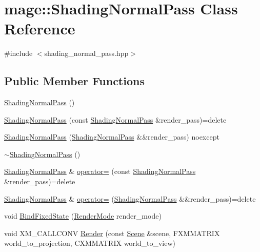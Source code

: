 \hypertarget{classmage_1_1_shading_normal_pass}{}\section{mage\+:\+:Shading\+Normal\+Pass Class Reference}
\label{classmage_1_1_shading_normal_pass}


{\ttfamily \#include $<$shading\+\_\+normal\+\_\+pass.\+hpp$>$}

\subsection*{Public Member Functions}
\begin{DoxyCompactItemize}
\item 
\hyperlink{classmage_1_1_shading_normal_pass_a8d85834472875ce27cf3966b7c561d1f}{Shading\+Normal\+Pass} ()
\item 
\hyperlink{classmage_1_1_shading_normal_pass_ab13b45f9a3118f8494150d64ff06f94f}{Shading\+Normal\+Pass} (const \hyperlink{classmage_1_1_shading_normal_pass}{Shading\+Normal\+Pass} \&render\+\_\+pass)=delete
\item 
\hyperlink{classmage_1_1_shading_normal_pass_ab5d2c287dd28b0161a0b267373e264ff}{Shading\+Normal\+Pass} (\hyperlink{classmage_1_1_shading_normal_pass}{Shading\+Normal\+Pass} \&\&render\+\_\+pass) noexcept
\item 
\hyperlink{classmage_1_1_shading_normal_pass_aba7194077210d32dbcbc6cfbf4adba8f}{$\sim$\+Shading\+Normal\+Pass} ()
\item 
\hyperlink{classmage_1_1_shading_normal_pass}{Shading\+Normal\+Pass} \& \hyperlink{classmage_1_1_shading_normal_pass_afef400a6e3b00a43f6b6d3a3f34d43b7}{operator=} (const \hyperlink{classmage_1_1_shading_normal_pass}{Shading\+Normal\+Pass} \&render\+\_\+pass)=delete
\item 
\hyperlink{classmage_1_1_shading_normal_pass}{Shading\+Normal\+Pass} \& \hyperlink{classmage_1_1_shading_normal_pass_a25a9ba6a32a246176929f4de1a4adf0c}{operator=} (\hyperlink{classmage_1_1_shading_normal_pass}{Shading\+Normal\+Pass} \&\&render\+\_\+pass)=delete
\item 
void \hyperlink{classmage_1_1_shading_normal_pass_a49c57b6c8a6aee0678556f25f9c97d11}{Bind\+Fixed\+State} (\hyperlink{namespacemage_a9d24b35ed0bdecf8535e2b91fe0eebba}{Render\+Mode} render\+\_\+mode)
\item 
void X\+M\+\_\+\+C\+A\+L\+L\+C\+O\+NV \hyperlink{classmage_1_1_shading_normal_pass_a21f09077193e7b1dd50cd0968a66b6a6}{Render} (const \hyperlink{classmage_1_1_scene}{Scene} \&scene, F\+X\+M\+M\+A\+T\+R\+IX world\+\_\+to\+\_\+projection, C\+X\+M\+M\+A\+T\+R\+IX world\+\_\+to\+\_\+view)
\end{DoxyCompactItemize}
